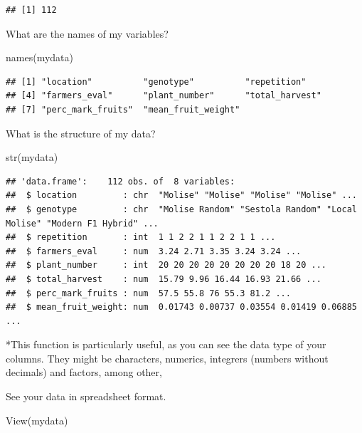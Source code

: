 \documentclass[
]{book}
\newenvironment{Shaded}{\begin{snugshade}}{\end{snugshade}}
\newcommand{\FunctionTok}[1]{\textcolor[rgb]{0.00,0.00,0.00}{#1}}
\newcommand{\NormalTok}[1]{#1}
\begin{document}
\begin{verbatim}
## [1] 112
\end{verbatim}

What are the names of my variables?

\begin{Shaded}
\begin{Highlighting}[]
\FunctionTok{names}\NormalTok{(mydata)}
\end{Highlighting}
\end{Shaded}

\begin{verbatim}
## [1] "location"          "genotype"          "repetition"       
## [4] "farmers_eval"      "plant_number"      "total_harvest"    
## [7] "perc_mark_fruits"  "mean_fruit_weight"
\end{verbatim}

What is the structure of my data?

\begin{Shaded}
\begin{Highlighting}[]
\FunctionTok{str}\NormalTok{(mydata)}
\end{Highlighting}
\end{Shaded}

\begin{verbatim}
## 'data.frame':    112 obs. of  8 variables:
##  $ location         : chr  "Molise" "Molise" "Molise" "Molise" ...
##  $ genotype         : chr  "Molise Random" "Sestola Random" "Local Molise" "Modern F1 Hybrid" ...
##  $ repetition       : int  1 1 2 2 1 1 2 2 1 1 ...
##  $ farmers_eval     : num  3.24 2.71 3.35 3.24 3.24 ...
##  $ plant_number     : int  20 20 20 20 20 20 20 20 18 20 ...
##  $ total_harvest    : num  15.79 9.96 16.44 16.93 21.66 ...
##  $ perc_mark_fruits : num  57.5 55.8 76 55.3 81.2 ...
##  $ mean_fruit_weight: num  0.01743 0.00737 0.03554 0.01419 0.06885 ...
\end{verbatim}

*This function is particularly useful, as you can see the data type of your columns. They might be characters, numerics, integrers (numbers without decimals) and factors, among other,

See your data in spreadsheet format.

\begin{Shaded}
\begin{Highlighting}[]
\FunctionTok{View}\NormalTok{(mydata)}
\end{Highlighting}
\end{Shaded}
\end{document}
